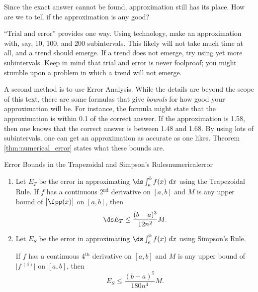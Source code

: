 Since the exact answer cannot be found, approximation still has its place. How are we to tell if the approximation is any good?

``Trial and error'' provides one way. %
Using technology, make an approximation with, say, 10, 100, and 200 subintervals. This likely will not take much time at all, and a trend should emerge. If a trend does not emerge, try using yet more subintervals. Keep in mind that trial and error is never foolproof; you might stumble upon a problem in which a trend will not emerge.


A second method is to use Error Analysis. While the details are beyond the scope of this text, there are some formulas that give \textit{bounds} for how good your approximation will be. For instance, the formula might state that the approximation is within 0.1 of the correct answer. If the approximation is 1.58, then one knows that the correct answer is between 1.48 and 1.68. By using lots of subintervals, one can get an approximation as accurate as one likes. Theorem \ref{thm:numerical_error} states what these bounds are.


\begin{theorem}{Error Bounds in the Trapezoidal and Simpson's Rules}{numericalerror}
\begin{enumerate}
\item	Let $E_T$ be the error in approximating $\ds \int_a^b f(x)\ dx$ using the Trapezoidal Rule. 
If $f$ has a continuous 2$^\text{nd}$ derivative on $[a,b]$ and $M$ is any upper bound of $\big|\fpp(x)\big|$ on $[a,b]$, then
$$\ds E_T \leq \frac{(b-a)^3}{12n^2}M.$$

\item	Let $E_S$ be the error in approximating $\ds \int_a^b f(x)\ dx$ using Simpson's Rule. 

If $f$ has a continuous 4$^\text{th}$ derivative on $[a,b]$ and $M$ is any upper bound of $\big|f\,^{(4)}\big|$ on $[a,b]$, then
$$E_S \leq \frac{(b-a)^5}{180n^4}M.$$
\end{enumerate}
\end{theorem}

